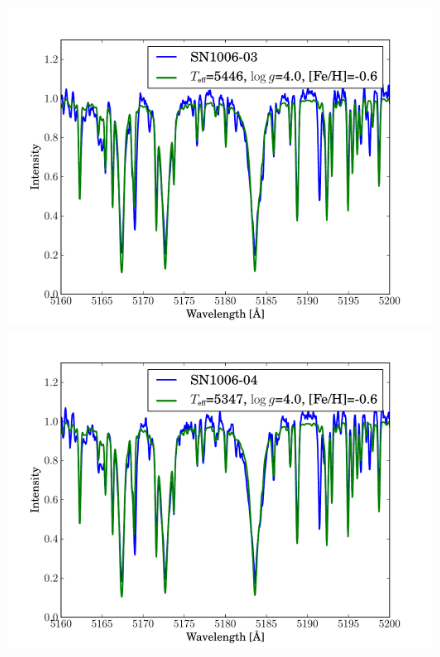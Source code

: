\begin{figure}[tb]
   \label{fig:sn1006_candfit}
\end{figure}\begin{figure}[tb] %
   \centering
\includegraphics[width=1.1\textwidth, trim=0 0mm 0 10mm, clip]{chapter_sn1006/plots/gold_spectra/sn1006_03.pdf}
\includegraphics[width=1.1\textwidth, trim=0 0mm 0 10mm, clip]{chapter_sn1006/plots/gold_spectra/sn1006_04.pdf}


\end{figure}
